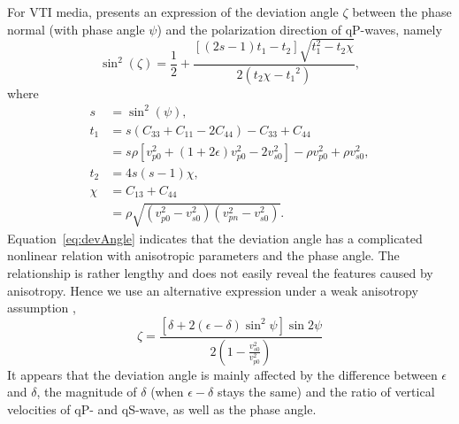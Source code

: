 
For VTI media,  \cite{dellinger.thesis} presents an expression of the deviation angle $\zeta$ between the phase normal
(with phase angle $\psi$) and the polarization direction of qP-waves, namely
\begin{equation}
\label{eq:devAngle}
\sin^2(\zeta)=\frac{1}{2}+\frac{[(2s-1)t_{1}-t_{2}]\sqrt{t_{1}^2-t_{2}\chi}}{2(t_{2}\chi-{t_{1}}^2)},
\end{equation}
where
\begin{equation}
\begin{split}
s & =  \sin^2(\psi), \\
t_{1} & =  s(C_{33}+C_{11}-2C_{44})-C_{33}+C_{44} \\
      & =  s\rho[v_{p0}^2+(1+2\epsilon)v_{p0}^2-2v_{s0}^2]-\rho{v_{p0}^2}+\rho{v_{s0}^2}, \\
t_{2} & =  4s(s-1)\chi, \\
\chi & =  C_{13}+C_{44} \\ 
     & =  \rho\sqrt{(v_{p0}^2-v_{s0}^2)(v_{pn}^2-v_{s0}^2)}.
\end{split}
\end{equation}
Equation~\ref{eq:devAngle} indicates that the deviation angle has a complicated nonlinear relation with anisotropic parameters 
and the phase angle. The relationship is rather lengthy and does not easily reveal the features caused by anisotropy.
 Hence we use an alternative expression under a weak anisotropy assumption \cite[]{rommel:1994, tsvankin:2001},
\begin{equation}
\zeta=\frac{[\delta+2(\epsilon-\delta)\sin^2{\psi}]\sin{2\psi}}{2(1-\frac{v_{s0}^2}{v_{p0}^2})}
\end{equation}
It appears that the deviation angle is mainly affected by the difference between $\epsilon$ and $\delta$,
 the magnitude of $\delta$ (when $\epsilon-\delta$ stays the same) and the ratio of vertical velocities of
 qP- and qS-wave, as well as the phase angle.

\newpage



